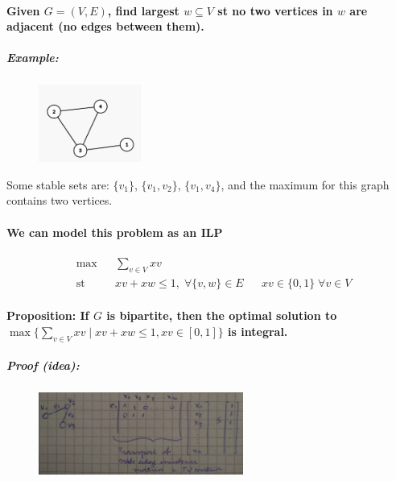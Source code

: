 \documentclass[main]{subfiles}
\begin{document}
\paragraph{Given $G=(V,E)$, find largest $w \subseteq V$ st no two vertices in
$w$ are adjacent (no edges between them).}

\subparagraph{Example:}
\begin{figure}[!h]
  \label{fig:projection}
  \centering
    \includegraphics[width=0.3\textwidth]{imgs/graph-stable-set.png}
\end{figure}

Some stable sets are: $\{v_1\}$, $\{v_1, v_2\}$, $\{v_1, v_4\}$, and the
maximum for this graph contains two vertices.

\paragraph{We can model this problem as an ILP}
\begin{equation*}
\begin{aligned}
& \max
& & \sum_{v \in V} x v \\
& \text{st}
& & xv + xw \leq 1, \; \forall \{v, w\} \in E
& & xv \in \{0,1\} \; \forall v \in V
\end{aligned}
\end{equation*}

\paragraph{Proposition: If $G$ is bipartite, then the optimal solution to
$\max \{ \sum_{v \in V} xv \mid xv + xw \leq 1, xv \in [0,1] \}$ is integral.}

\subparagraph{Proof (idea):}
\begin{figure}[!h]
  \label{fig:projection}
  \centering
    \includegraphics[width=0.6\textwidth]{imgs/bipartite-integral-solution.jpg}
\end{figure}
\end{document}
